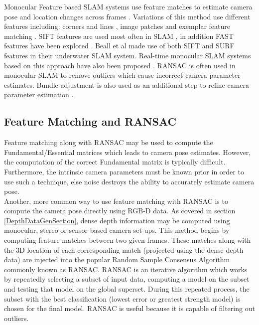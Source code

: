 Monocular Feature based SLAM systems use feature matches to estimate camera pose and location changes across frames \cite{Davison02Simultaneous}. Variations of this method use different features including: corners and lines \cite{Jeong06Visual}, image patches \cite{Silveira08Efficient} and exemplar feature matching \cite{Chekhlov07Robust}. SIFT features are used most often in SLAM \cite{Jensfelt06Framework,Pollefeys08Detailed,Beall11Bundle,Eudes10Fast}, in addition FAST features have been explored \cite{Kundu10Realtime,Leelasawassuk133d,Konolige10View,Konolige08Frameslam}. Beall et al \cite{Beall11Bundle} made use of both SIFT and SURF features in their underwater SLAM system. Real-time monocular SLAM systems based on this approach have also been proposed \cite{Chekhlov07Robust,Pollefeys08Detailed}. RANSAC is often used in monocular SLAM \cite{Eudes10Fast,Kundu10Realtime,Konolige10View,Konolige08Frameslam,Pradeep13Monofusion} to remove outliers which cause incorrect camera parameter estimates. Bundle adjustment is also used as an additional step to refine camera parameter estimation \cite{Eudes10Fast}.  \\


\subsection{Feature Matching and RANSAC}
\label{FMANDFM}

Feature matching along with RANSAC  may be used to compute the Fundamental/Essential matrices which leads to camera pose estimates. However, the computation of the correct Fundamental matrix is typically difficult. Furthermore, the intrinsic camera parameters must be known prior in order to use such a technique, else noise destroys the ability to accurately estimate camera pose. \\

Another, more common way to use feature matching with RANSAC \cite{Fischler81Random,Chen99Ransac} is to compute the camera pose directly using RGB-D data. As covered in section \ref{DepthDataGenSection}, dense depth information may be computed using monocular, stereo or sensor based camera set-ups. This method begins by computing feature matches between two given frames. These matches along with the 3D location of each corresponding match (projected using the dense depth data) are injected into the popular Random Sample Consensus Algorithm commonly known as RANSAC. RANSAC is an iterative algorithm which works by repeatedly selecting a subset of input data, computing a model on the subset and testing that model on the global superset. During this repeated process, the subset with the best classification (lowest error or greatest strength model) is chosen for the final model. RANSAC is useful because it is capable of filtering out outliers. \\

